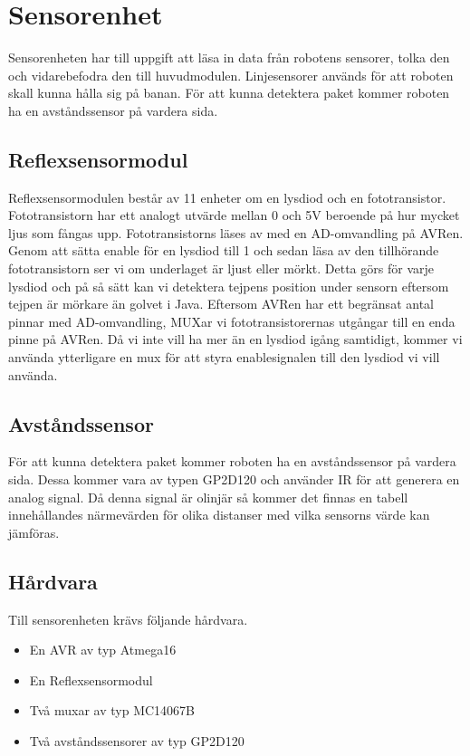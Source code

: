 %

\section{Sensorenhet}
Sensorenheten har till uppgift att läsa in data från robotens sensorer, tolka den och vidarebefodra den till huvudmodulen. Linjesensorer används för att roboten skall kunna hålla sig på banan. För att kunna detektera paket kommer roboten ha en avståndssensor på vardera sida. \\


\subsection{Reflexsensormodul}
Reflexsensormodulen består av 11 enheter om en lysdiod och en fototransistor. Fototransistorn har ett analogt utvärde mellan 0 och 5V beroende på hur mycket ljus som fångas upp. Fototransistorns läses av med en AD-omvandling på AVRen. Genom att sätta enable för en lysdiod till 1 och sedan läsa av den tillhörande fototransistorn ser vi om underlaget är ljust eller mörkt. Detta görs för varje lysdiod och på så sätt kan vi detektera tejpens position under sensorn eftersom tejpen är mörkare än golvet i Java. Eftersom AVRen har ett begränsat antal pinnar med AD-omvandling, MUXar vi fototransistorernas utgångar till en enda pinne på AVRen. Då vi inte vill ha mer än en lysdiod igång samtidigt, kommer vi använda ytterligare en mux för att styra enablesignalen till den lysdiod vi vill använda.

\subsection{Avståndssensor}
För att kunna detektera paket kommer roboten ha en avståndssensor på vardera sida. Dessa kommer vara av typen GP2D120 och använder IR för att generera en analog signal. Då denna signal är olinjär så kommer det finnas en tabell innehållandes närmevärden för olika distanser med vilka sensorns värde kan jämföras.

\subsection{Hårdvara}
Till sensorenheten krävs följande hårdvara.
\begin{itemize}
\item{En AVR av typ Atmega16}
\item{En Reflexsensormodul}
\item{Två muxar av typ MC14067B}
\item{Två avståndssensorer av typ GP2D120}
\end{itemize}


